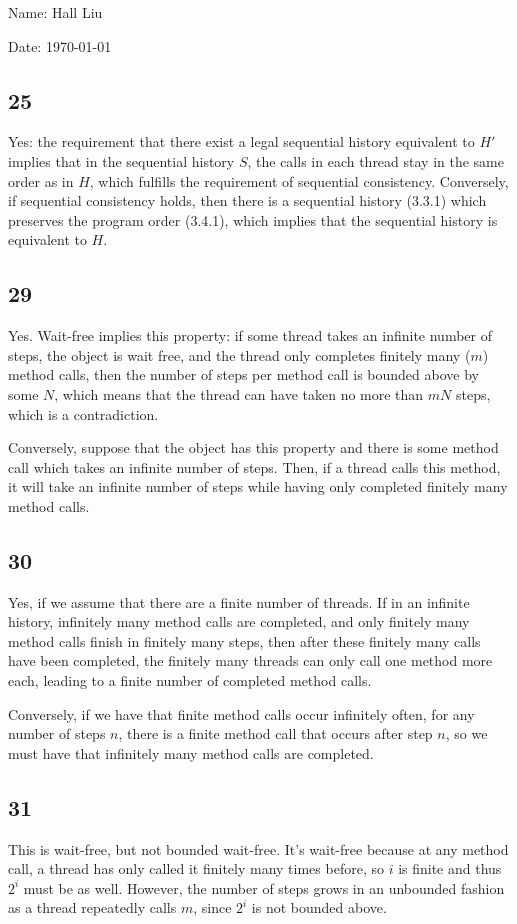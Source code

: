 \documentclass{article}
\begin{document}
Name: Hall Liu

Date: \today 
\vspace{1.5cm}
\subsection*{25}
Yes: the requirement that there exist a legal sequential history equivalent to $H'$ implies that in the sequential history $S$, the calls in each thread stay in the same order as in $H$, which fulfills the requirement of sequential consistency. Conversely, if sequential consistency holds, then there is a sequential history (3.3.1) which preserves the program order (3.4.1), which implies that the sequential history is equivalent to $H$.
\subsection*{29}
Yes. Wait-free implies this property: if some thread takes an infinite number of steps, the object is wait free, and the thread only completes finitely many ($m$) method calls, then the number of steps per method call is bounded above by some $N$, which means that the thread can have taken no more than $mN$ steps, which is a contradiction.

Conversely, suppose that the object has this property and there is some method call which takes an infinite number of steps. Then, if a thread calls this method, it will take an infinite number of steps while having only completed finitely many method calls.
\subsection*{30}
Yes, if we assume that there are a finite number of threads. If in an infinite history, infinitely many method calls are completed, and only finitely many method calls finish in finitely many steps, then after these finitely many calls have been completed, the finitely many threads can only call one method more each, leading to a finite number of completed method calls.

Conversely, if we have that finite method calls occur infinitely often, for any number of steps $n$, there is a finite method call that occurs after step $n$, so we must have that infinitely many method calls are completed.
\subsection*{31}
This is wait-free, but not bounded wait-free. It's wait-free because at any method call, a thread has only called it finitely many times before, so $i$ is finite and thus $2^i$ must be as well. However, the number of steps grows in an unbounded fashion as a thread repeatedly calls $m$, since $2^i$ is not bounded above.
\end{document}
